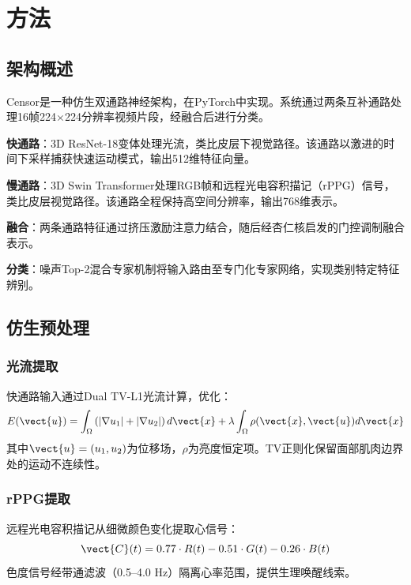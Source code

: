 
\section{方法}

\subsection{架构概述}

Censor是一种仿生双通路神经架构，在PyTorch中实现。系统通过两条互补通路处理16帧224$\times$224分辨率视频片段，经融合后进行分类。

\textbf{快通路}：3D ResNet-18变体处理光流，类比皮层下视觉路径。该通路以激进的时间下采样捕获快速运动模式，输出512维特征向量。

\textbf{慢通路}：3D Swin Transformer处理RGB帧和远程光电容积描记（rPPG）信号，类比皮层视觉路径。该通路全程保持高空间分辨率，输出768维表示。

\textbf{融合}：两条通路特征通过挤压激励注意力结合，随后经杏仁核启发的门控调制融合表示。

\textbf{分类}：噪声Top-2混合专家机制将输入路由至专门化专家网络，实现类别特定特征辨别。

\subsection{仿生预处理}

\subsubsection{光流提取}

快通路输入通过Dual TV-L1光流计算\cite{wang2015offapexnet}，优化：
\begin{equation}
E(\vect{u}) = \int_\Omega \left( |\nabla u_1| + |\nabla u_2| \right) d\vect{x} + \lambda \int_\Omega \rho(\vect{x}, \vect{u}) d\vect{x}
\end{equation}
其中$\vect{u} = (u_1, u_2)$为位移场，$\rho$为亮度恒定项。TV正则化保留面部肌肉边界处的运动不连续性。

\subsubsection{rPPG提取}

远程光电容积描记从细微颜色变化提取心信号：
\begin{equation}
\vect{C}(t) = 0.77 \cdot R(t) - 0.51 \cdot G(t) - 0.26 \cdot B(t)
\end{equation}
色度信号经带通滤波（0.5--4.0 Hz）隔离心率范围，提供生理唤醒线索。

